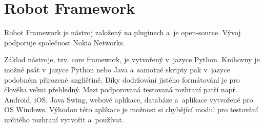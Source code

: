 	\section{Robot Framework}
	Robot Framework je nástroj založený na pluginech a~je open-source. Vývoj podporuje společnost Nokia Networks.
	
	Základ nástroje, tzv. core framework, je vytvořený v~jazyce Python. Knihovny je možné psát v~jazyce Python nebo Java a~samotné skripty pak v~jazyce podobném přirozené angličtině. Díky dodržování jistého formátování je pro člověka velmi přehledný. Mezi podporovaná testovaná rozhraní patří např. Android, iOS, Java Swing, webové aplikace, databáze a~aplikace vytvořené pro OS Windows. Výhodou této aplikace je možnost si chybějící modul pro testování určitého rozhraní vytvořit a~používat.